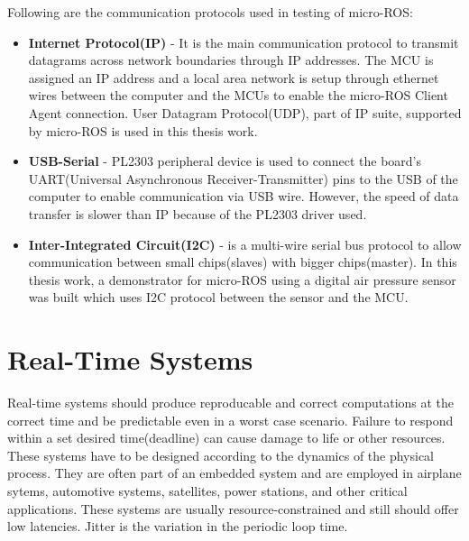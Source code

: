 \documentclass[%
xelatex,
	oneside,		%
	12pt,			%
	parskip=half,	%
	abstracton,
	chapterprefix=true%
    appendixprefix=true]
{scrbook}
\begin{document}
	
\vspace*{0.5cm}
Following are the communication protocols used in testing of micro-ROS:
\begin{itemize}
\item {\bfseries Internet Protocol(IP)} - It is the main communication protocol to transmit datagrams across network boundaries through IP addresses. The MCU is assigned an IP address and a local area network is setup through ethernet wires between the computer and the MCUs to enable the micro-ROS Client Agent connection. User Datagram Protocol(UDP), part of IP suite, supported by micro-ROS is used in this thesis work.
\item {\bfseries USB-Serial} - PL2303 peripheral device is used to connect the board’s UART(Universal Asynchronous Receiver-Transmitter) pins to the USB of the computer to enable communication via USB wire. However, the speed of data transfer is slower than IP because of the PL2303 driver used.
\item {\bfseries Inter-Integrated Circuit(I2C)} - is a multi-wire serial bus protocol to allow communication between small chips(slaves) with bigger chips(master). In this thesis work, a demonstrator for micro-ROS using a digital air pressure sensor was built which uses I2C protocol between the sensor and the MCU.
\end{itemize}

	
	\section{Real-Time Systems}
	
	
	\vspace*{0.5cm}	
Real-time systems should produce reproducable and correct computations at the correct time and be predictable even in a worst case scenario. Failure to respond within a set desired time(deadline) can cause damage to life or other resources. These systems have to be designed according to the dynamics of the physical process. They are often part of an embedded system and are employed in airplane sytems, automotive systems, satellites, power stations, and other critical applications. These systems are usually resource-constrained and still should offer low latencies. Jitter is the variation in the periodic loop time.
	
\end{document}
